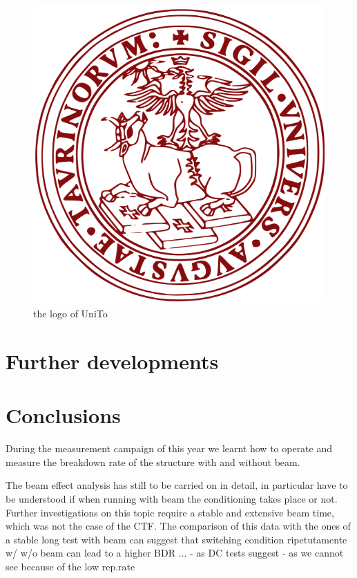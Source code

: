 \begin{figure}
\centering

\includegraphics[scale=0.15]{head/logo.png}
\caption{the logo of UniTo}

\end{figure}


\section[Further developments]{Further developments}



\section{Conclusions}

During the measurement campaign of this year we learnt how to operate and measure the breakdown rate of the structure with and without beam.

The beam effect analysis has still to be carried on in detail, in particular have to be understood if when running with beam the conditioning takes place or not. Further investigations on this topic require a stable and extensive beam time, which was not the case of the CTF. The comparison of this data with the ones of a stable long test with beam can suggest that switching condition ripetutamente w/ w/o beam can lead to a higher BDR ...
- as DC tests suggest
- as we cannot see because of the low rep.rate